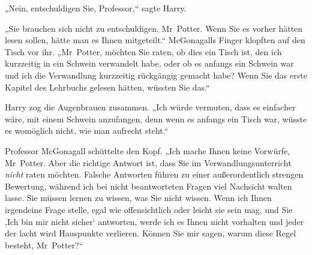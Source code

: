 „Nein, entschuldigen Sie, Professor,“ sagte Harry.

„Sie brauchen sich nicht zu entschuldigen, Mr~Potter. Wenn Sie es vorher hätten lesen sollen, hätte man es Ihnen mitgeteilt.“ McGonagalls Finger klopften auf den Tisch vor ihr. „Mr~Potter, möchten Sie raten, ob dies ein Tisch ist, den ich kurzzeitig in ein Schwein verwandelt habe, oder ob es anfangs ein Schwein war und ich die Verwandlung kurzzeitig rückgängig gemacht habe? Wenn Sie das erste Kapitel des Lehrbuchs gelesen hätten, wüssten Sie das.“

Harry zog die Augenbrauen zusammen. „Ich würde vermuten, dass es einfacher wäre, mit einem Schwein anzufangen, denn wenn es anfangs ein Tisch war, wüsste es womöglich nicht, wie man aufrecht steht.“

Professor McGonagall schüttelte den Kopf. „Ich mache Ihnen keine Vorwürfe, Mr~Potter. Aber die richtige Antwort ist, dass Sie im Verwandlungsunterricht \emph{nicht} raten möchten. Falsche Antworten führen zu einer außerordentlich strengen Bewertung, während ich bei nicht beantworteten Fragen viel Nachsicht walten lasse. Sie müssen lernen zu wissen, was Sie nicht wissen. Wenn ich Ihnen irgendeine Frage stelle, egal wie offensichtlich oder leicht sie sein mag, und Sie ‚Ich bin mir nicht sicher‘ antworten, werde ich es Ihnen nicht vorhalten und jeder der lacht wird Hauspunkte verlieren. Können Sie mir sagen, warum diese Regel besteht, Mr~Potter?“

